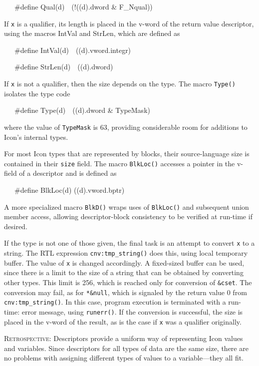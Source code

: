 {\ttfamily\mdseries
\ \ \ \#define Qual(d)\ \ (!((d).dword \& F\_Nqual))}

If \texttt{x} is a qualifier, its length is placed in the v-word of
the return value descriptor, using the macros IntVal and StrLen, which
are defined as

{\ttfamily\mdseries
\ \ \ \#define IntVal(d)\ \ ((d).vword.integr)}

{\ttfamily\mdseries
\ \ \ \#define StrLen(d)\ \ ((d).dword)}


If \texttt{x} is not a qualifier, then the size depends on the
type. The macro \texttt{Type()} isolates the type code

{\ttfamily\mdseries
\ \ \ \#define Type(d)\ \ ((d).dword \& TypeMask)}

\noindent where the value of \texttt{TypeMask} is 63, providing
considerable room for additions to Icon's internal types.

For most Icon types that are represented by blocks, their
source-language size is contained in their \texttt{size} field. The
macro \texttt{BlkLoc()} accesses a pointer in the v-field of a
descriptor and is defined as

{\ttfamily\mdseries
\ \ \ \#define BlkLoc(d) ((d).vword.bptr)}

A more specialized macro \texttt{BlkD()} wraps uses of
\texttt{BlkLoc()} and subsequent union member access, allowing
descriptor-block consistency to be verified at run-time if desired.


If the type is not one of those given, the final task is an attempt to
convert \texttt{x} to a string. The RTL expression
\texttt{cnv:tmp\_string()} does this, using local temporary
buffer. The value of \texttt{x} is changed accordingly. A fixed-sized
buffer can be used, since there is a limit to the size of a string
that can be obtained by converting other types. This limit is 256,
which is reached only for conversion of \texttt{\&cset}. The
conversion may fail, as for \texttt{*\&null}, which is signaled by the
return value 0 from \texttt{cnv:tmp\_string()}. In this case, program
execution is terminated with a run-time: error message, using
\texttt{runerr()}. If the conversion is successful, the size is placed
in the v-word of the result, as is the case if \texttt{x} was a
qualifier originally.

\textsc{Retrospective}: Descriptors provide a uniform way of
representing Icon values and variables. Since descriptors for all
types of data are the same size, there are no problems with assigning
different types of values to a variable---they all fit.

